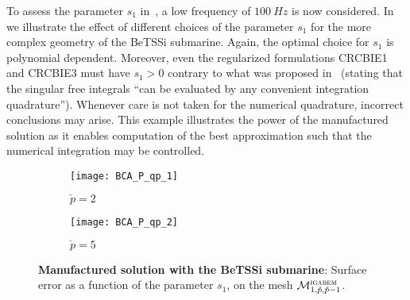 To assess the parameter $s_1$ in~, a low frequency of $\SI{100}{Hz}$ is now considered. In  we illustrate the effect of different choices of the parameter $s_1$ for the more complex geometry of the BeTSSi submarine. Again, the optimal choice for $s_1$ is polynomial dependent. Moreover, even the regularized formulations CRCBIE1 and CRCBIE3 must have $s_1>0$ contrary to what was proposed in~\cite{Sun2015bri} (stating that the singular free integrals ``can be evaluated by any convenient integration quadrature''). Whenever care is not taken for the numerical quadrature, incorrect conclusions may arise. This example illustrates the power of the manufactured solution as it enables computation of the best approximation such that the numerical integration may be controlled.
\begin{figure}
	\centering    
	\begin{subfigure}[t]{0.49\textwidth}
		\centering
		\texttt{[image: BCA\_P\_qp\_1]}
		\caption{$\check{p} = 2$}
	\end{subfigure}%
	\hspace*{0.02\textwidth}%
	\begin{subfigure}[t]{0.49\textwidth}
		\centering
		\texttt{[image: BCA\_P\_qp\_2]}
		\caption{$\check{p} = 5$}
	\end{subfigure}
	\caption{\textbf{Manufactured solution with the BeTSSi submarine}: Surface error as a function of the parameter $s_1$, on the mesh ${\cal M}_{1,\check{p},\check{p}-1}^{\textsc{igabem}}$.}
	\label{Fig3:BCA_P_qp}
\end{figure}

